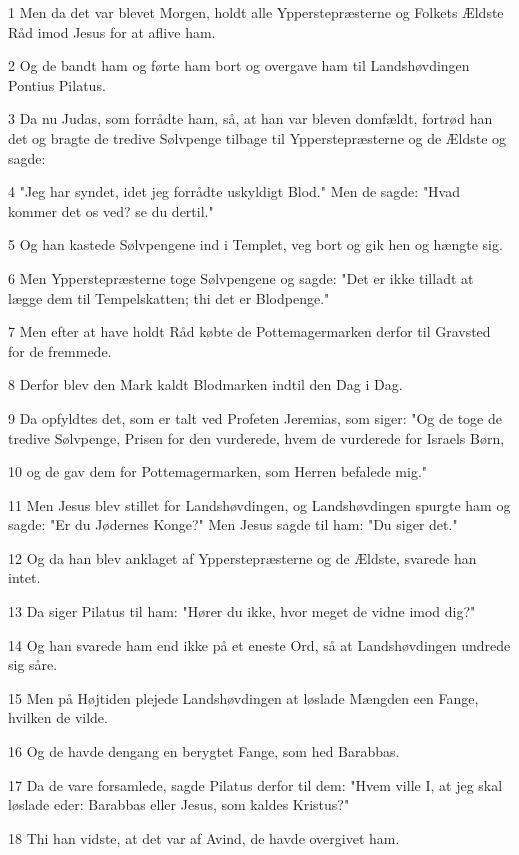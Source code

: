\par 1 Men da det var blevet Morgen, holdt alle Ypperstepræsterne og Folkets Ældste Råd imod Jesus for at aflive ham.
\par 2 Og de bandt ham og førte ham bort og overgave ham til Landshøvdingen Pontius Pilatus.
\par 3 Da nu Judas, som forrådte ham, så, at han var bleven domfældt, fortrød han det og bragte de tredive Sølvpenge tilbage til Ypperstepræsterne og de Ældste og sagde:
\par 4 "Jeg har syndet, idet jeg forrådte uskyldigt Blod." Men de sagde: "Hvad kommer det os ved? se du dertil."
\par 5 Og han kastede Sølvpengene ind i Templet, veg bort og gik hen og hængte sig.
\par 6 Men Ypperstepræsterne toge Sølvpengene og sagde: "Det er ikke tilladt at lægge dem til Tempelskatten; thi det er Blodpenge."
\par 7 Men efter at have holdt Råd købte de Pottemagermarken derfor til Gravsted for de fremmede.
\par 8 Derfor blev den Mark kaldt Blodmarken indtil den Dag i Dag.
\par 9 Da opfyldtes det, som er talt ved Profeten Jeremias, som siger: "Og de toge de tredive Sølvpenge, Prisen for den vurderede, hvem de vurderede for Israels Børn,
\par 10 og de gav dem for Pottemagermarken, som Herren befalede mig."
\par 11 Men Jesus blev stillet for Landshøvdingen, og Landshøvdingen spurgte ham og sagde: "Er du Jødernes Konge?" Men Jesus sagde til ham: "Du siger det."
\par 12 Og da han blev anklaget af Ypperstepræsterne og de Ældste, svarede han intet.
\par 13 Da siger Pilatus til ham: "Hører du ikke, hvor meget de vidne imod dig?"
\par 14 Og han svarede ham end ikke på et eneste Ord, så at Landshøvdingen undrede sig såre.
\par 15 Men på Højtiden plejede Landshøvdingen at løslade Mængden een Fange, hvilken de vilde.
\par 16 Og de havde dengang en berygtet Fange, som hed Barabbas.
\par 17 Da de vare forsamlede, sagde Pilatus derfor til dem: "Hvem ville I, at jeg skal løslade eder: Barabbas eller Jesus, som kaldes Kristus?"
\par 18 Thi han vidste, at det var af Avind, de havde overgivet ham.

